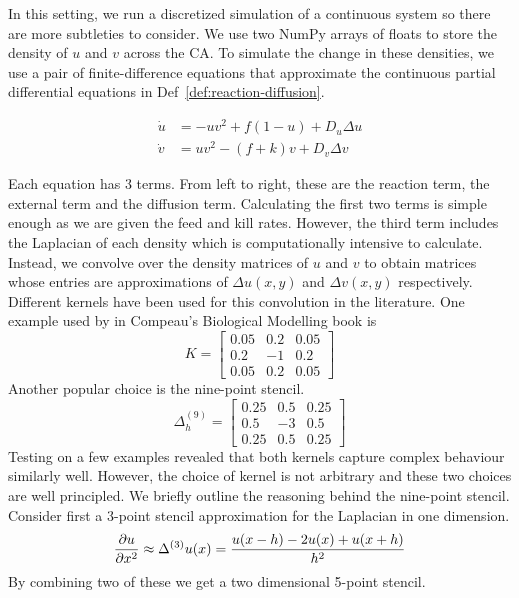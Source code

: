 In this setting, we run a discretized simulation of a continuous system so there are more subtleties to consider. We use two NumPy arrays of floats to store the density of $u$ and $v$ across the CA. To simulate the change in these densities, we use a pair of finite-difference equations that approximate the continuous partial differential equations in Def~\ref{def:reaction-diffusion}.
\begin{definition}\label{def:gs}
\begin{align*}
  \dot{u} &= -uv^2 + f(1-u) + D_u \Delta u\\
  \dot{v} &= uv^2 - (f+k)v + D_v \Delta v
\end{align*}
\end{definition}
Each equation has 3 terms. From left to right, these are the reaction term, the external term and the diffusion term. Calculating the first two terms is simple enough as we are given the feed and kill rates.  However, the third term includes the Laplacian of each density which is computationally intensive to calculate. Instead, we convolve over the density matrices of $u$ and $v$ to obtain matrices whose entries are approximations of $\Delta u(x,y)$ and $\Delta v(x,y)$ respectively. Different kernels have been used for this convolution in the literature. One example used by in Compeau's Biological Modelling book\cite{compeau} is
\[
  K= \begin{bmatrix}
    0.05 & 0.2 & 0.05\\
    0.2 & -1 & 0.2\\
    0.05 & 0.2 & 0.05
  \end{bmatrix}
\]
Another popular choice is the nine-point stencil\cite{rosser1975nine}.
\[
  \Delta^{(9)}_h = \begin{bmatrix}
    0.25 & 0.5 & 0.25\\
    0.5 & -3 & 0.5\\
    0.25 & 0.5 & 0.25
  \end{bmatrix}
\]
Testing on a few examples revealed that both kernels capture complex behaviour similarly well. However, the choice of kernel is not arbitrary and these two choices are well principled. We briefly outline the reasoning behind the nine-point stencil. Consider first a 3-point stencil approximation for the Laplacian in one dimension.
\[
  \pdv{u}{x^2} \approx \Delta^{(3)}u(x) = \frac{u(x-h) -2u(x) + u(x+h)}{h^2}
\]
By combining two of these we get a two dimensional 5-point stencil.
